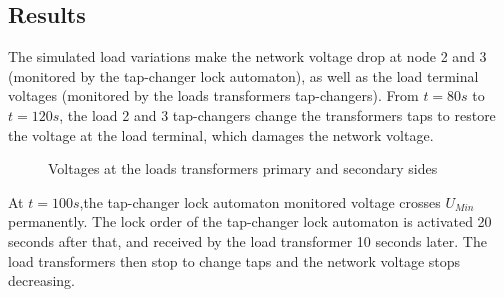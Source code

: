 \documentclass[a4paper, 12pt]{report}
\begin{document}
\subsection{Results}

The simulated load variations make the network voltage drop at node 2 and 3 (monitored by the tap-changer lock automaton), as well as the load terminal voltages (monitored by the loads transformers tap-changers). From $t=80s$ to $t=120s$, the load 2 and 3 tap-changers change the transformers taps to restore the voltage at the load terminal, which damages the network voltage.

\begin{figure}[H]
\caption{Voltages at the loads transformers primary and secondary sides}
\end{figure}

At $t=100s$,the tap-changer lock automaton monitored voltage crosses $U_{Min}$ permanently. The lock order of the tap-changer lock automaton is activated 20 seconds after that, and received by the load transformer 10 seconds later. The load transformers then stop to change taps and the network voltage stops decreasing.
\end{document}
